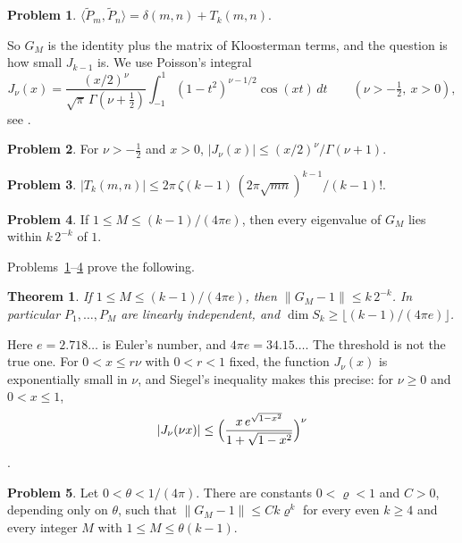 \documentclass[reqno]{amsart}
\theoremstyle{definition}
\newtheorem{problem}{Problem}[section]
\theoremstyle{plain}
\newtheorem{theorem}{Theorem}[section]
\newcommand{\Pt}{\widetilde{P}}
\begin{document}
\begin{problem}\label{pr:gram}
\(\langle \Pt_m, \Pt_n\rangle = \delta(m,n) + T_k(m,n)\).
\end{problem}

So \(G_M\) is the identity plus the matrix of Kloosterman terms, and the question is how small \(J_{k-1}\) is.  We use Poisson's integral
\[
  J_\nu(x) = \frac{(x/2)^\nu}{\sqrt\pi\,\Gamma(\nu + \frac12)} \int_{-1}^1 (1 - t^2)^{\nu - 1/2} \cos(xt)\, dt \qquad (\nu > -\tfrac12,\ x > 0),
\]
see \cite[(10.9.4)]{DLMF}.

\begin{problem}\label{pr:J-bound}
For \(\nu > -\frac12\) and \(x > 0\), \(\lvert J_\nu(x)\rvert \le (x/2)^\nu/\Gamma(\nu + 1)\).
\end{problem}

\begin{problem}\label{pr:T-bound}
\(\lvert T_k(m,n)\rvert \le 2\pi\,\zeta(k-1)\,(2\pi\sqrt{mn})^{k-1}/(k-1)!\).
\end{problem}

\begin{problem}\label{pr:gershgorin}
If \(1 \le M \le (k-1)/(4\pi e)\), then every eigenvalue of \(G_M\) lies within \(k\,2^{-k}\) of \(1\).
\end{problem}

Problems~\ref{pr:gram}--\ref{pr:gershgorin} prove the following.

\begin{theorem}\label{thm:near}
If \(1 \le M \le (k-1)/(4\pi e)\), then \(\lVert G_M - 1\rVert \le k\,2^{-k}\).  In particular \(P_1, \dots, P_M\) are linearly independent, and \(\dim S_k \ge \lfloor (k-1)/(4\pi e)\rfloor\).
\end{theorem}

Here \(e = 2.718\ldots\) is Euler's number, and \(4\pi e = 34.15\ldots\).  The threshold is not the true one.  For \(0<x\le r\nu\) with \(0<r<1\) fixed, the function \(J_\nu(x)\) is exponentially small in \(\nu\), and Siegel's inequality makes this precise: for \(\nu \ge 0\) and \(0 < x \le 1\),
\[
  \lvert J_\nu(\nu x)\rvert \le \Bigl(\frac{x\, e^{\sqrt{1 - x^2}}}{1 + \sqrt{1 - x^2}}\Bigr)^{\nu}
\]
\cite[(10.14.5)]{DLMF}.

\begin{problem}\label{pr:siegel}
Let \(0 < \theta < 1/(4\pi)\).  There are constants \(0 < \varrho < 1\) and \(C > 0\), depending only on \(\theta\), such that \(\lVert G_M - 1\rVert \le C k\varrho^k\) for every even \(k \ge 4\) and every integer \(M\) with \(1 \le M \le \theta(k-1)\).
\end{problem}
\end{document}
